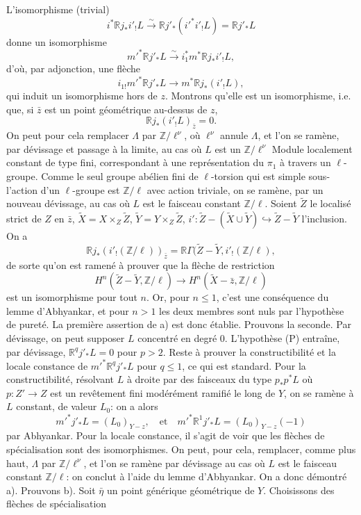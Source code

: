 \documentclass[11pt]{article}
\newcommand{\R}{\mathbb{R}}\newcommand{\RHomCore}{\mathbb{R}\mathrm{Hom}}
\providecommand{\R}{\mathrm R}
\begin{document}
L'isomorphisme (trivial)
\[
i^*\R j_*i'_!L\xrightarrow{\sim}\R j'_*(i'^*i'_!L)=\R j'_*L
\]
donne un
isomorphisme
\[
m'^*\R j'_*L\xrightarrow{\sim} i_1^*m^*\R j_*i'_!L,
\]
d'où, par adjonction, une flèche
\[
i_{1!}m'^*\R j'_*L\longrightarrow m^*\R j_*(i'_!L),
\]
qui induit un isomorphisme hors de $z$. Montrons qu'elle est un isomorphisme, i.e. que, si $\bar z$ est un point géométrique au-dessus de $z$,
\[
\R j_*(i'_!L)_{\bar z}=0.
\]
On peut pour cela remplacer $\Lambda$ par $\mathbb Z/\ell^\nu$, où $\ell^\nu$ annule $\Lambda$, et l'on se ramène, par dévissage et passage à la limite, au cas où $L$ est un $\mathbb Z/\ell^\nu$ Module localement constant de type fini, correspondant à une représentation du $\pi_1$ à travers un $\ell$-groupe. Comme le seul groupe abélien fini de $\ell$-torsion qui est simple sous-l'action d'un $\ell$-groupe est $\mathbb Z/\ell$ avec action triviale, on se ramène, par un nouveau dévissage, au cas où $L$ est le faisceau constant $\mathbb Z/\ell$. Soient $\widetilde Z$ le localisé strict de $Z$ en $\bar z$, $\widetilde X=X\times_Z\widetilde Z$, $\widetilde Y=Y\times_Z\widetilde Z$, $i':\widetilde Z-(\widetilde X\cup\widetilde Y)\hookrightarrow \widetilde Z-\widetilde Y$ l'inclusion. On a
\[
\R j_*(i'_!(\mathbb Z/\ell))_{\bar z}
=\R\Gamma(\widetilde Z-\widetilde Y,i'_!(\mathbb Z/\ell),
\]
de sorte qu'on est ramené à prouver que la flèche de restriction
\[
H^n(\widetilde Z-\widetilde Y,\mathbb Z/\ell)
\longrightarrow
H^n(\widetilde X-\bar z,\mathbb Z/\ell)
\]
est un isomorphisme pour tout $n$. Or, pour $n\le1$, c'est une conséquence du lemme d'Abhyankar, et pour $n>1$ les deux membres sont nuls par l'hypothèse de pureté. La première assertion de a) est donc établie. Prouvons la seconde. Par dévissage, on peut supposer $L$ concentré en degré $0$. L'hypothèse (P) entraîne, par dévissage, $\R^qj'_*L=0$ pour $p>2$. Reste à prouver la constructibilité et la locale constance de $m'^*\R^qj'_*L$ pour $q\le1$, ce qui est standard. Pour la constructibilité, résolvant $L$ à droite par des faisceaux du type $p_*p^*L$ où $p:Z'\to Z$ est un revêtement fini modérément ramifié le long de $Y$, on se ramène à $L$ constant, de valeur $L_0$: on a alors
\[
m'^*j'_*L=(L_0)_{Y-z},
\quad\text{et}\quad
m'^*\R^1j'_*L=(L_0)_{Y-z}(-1)
\]
par Abhyankar. Pour la locale constance, il s'agit de voir que les flèches de spécialisation sont des isomorphismes. On peut, pour cela,
remplacer, comme plus haut, $\Lambda$ par $\mathbb Z/\ell^\nu$, et l'on se ramène par dévissage au cas où $L$ est le faisceau constant $\mathbb Z/\ell$: on conclut à l'aide du lemme d'Abhyankar. On a donc démontré a). Prouvons b). Soit $\bar\eta$ un point générique géométrique de $Y$. Choisissons des flèches de spécialisation
\end{document}
